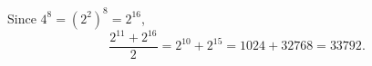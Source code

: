 Since $4^8=\left(2^2\right)^8=2^{16}$,
\[\dfrac{2^{11}+2^{16}}{2}=2^{10}+2^{15}=1024+32768=\boxed{33792}.\]
